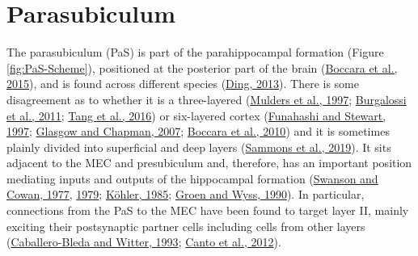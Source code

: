 \documentclass[
  12pt,
  a4paper,
  openany]{book}
\begin{document}
\hypertarget{parasubiculum}{%
\section{Parasubiculum}\label{parasubiculum}}

The parasubiculum (PaS) is part of the parahippocampal formation (Figure \ref{fig:PaS-Scheme}), positioned at the posterior part of the brain (\protect\hyperlink{ref-boccara_three-plane_2015}{Boccara et al., 2015}), and is found across different species (\protect\hyperlink{ref-ding_comparative_2013}{Ding, 2013}). There is some disagreement as to whether it is a three-layered (\protect\hyperlink{ref-mulders_neuron_1997}{Mulders et al., 1997}; \protect\hyperlink{ref-burgalossi_microcircuits_2011}{Burgalossi et al., 2011}; \protect\hyperlink{ref-tang_functional_2016}{Tang et al., 2016}) or six-layered cortex (\protect\hyperlink{ref-funahashi_presubicular_1997}{Funahashi and Stewart, 1997}; \protect\hyperlink{ref-glasgow_local_2007}{Glasgow and Chapman, 2007}; \protect\hyperlink{ref-boccara_grid_2010}{Boccara et al., 2010}) and it is sometimes plainly divided into superficial and deep layers (\protect\hyperlink{ref-sammons_electrophysiological_2019}{Sammons et al., 2019}). It sits adjacent to the MEC and presubiculum and, therefore, has an important position mediating inputs and outputs of the hippocampal formation (\protect\hyperlink{ref-swanson_autoradiographic_1977}{Swanson and Cowan, 1977}, \protect\hyperlink{ref-swanson_connections_1979}{1979}; \protect\hyperlink{ref-kohler_intrinsic_1985}{Köhler, 1985}; \protect\hyperlink{ref-van_groen_connections_1990}{Groen and Wyss, 1990}). In particular, connections from the PaS to the MEC have been found to target layer II, mainly exciting their postsynaptic partner cells including cells from other layers (\protect\hyperlink{ref-caballero-bleda_regional_1993}{Caballero-Bleda and Witter, 1993}; \protect\hyperlink{ref-canto_all_2012}{Canto et al., 2012}).
\end{document}
